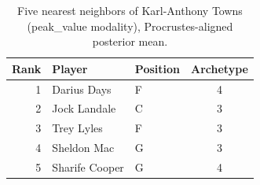 \begin{table}[htbp]
  \centering\small
  \begin{tabular}{rllc}
    \toprule
    Rank & Player & Position & Archetype \\
    \midrule
    1 & Darius Days & F & 4 \\
    2 & Jock Landale & C & 3 \\
    3 & Trey Lyles & F & 3 \\
    4 & Sheldon Mac & G & 3 \\
    5 & Sharife Cooper & G & 4 \\
    \bottomrule
  \end{tabular}
  \caption{Five nearest neighbors of Karl-Anthony Towns (peak_value modality), Procrustes-aligned posterior mean.}
  \label{tab:Karl_Anthony_Towns_neighbors_peak_value}
\end{table}

